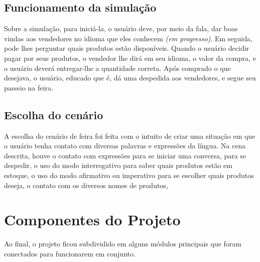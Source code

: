 \documentclass[a4paper]{article}
\begin{document}
    \subsection{Funcionamento da simulação}

        Sobre a simulação, para iniciá-la, o usuário deve, por meio da fala, dar
        boas vindas aos vendedores no idioma que eles conhecem \emph{(em
        progresso)}. Em seguida,
        pode lhes perguntar quais produtos estão disponíveis.
        Quando o usuário decidir pagar por seus
        produtos, o vendedor lhe dirá em seu idioma, o valor da compra, e o
        usuário deverá entregar-lhe a quantidade correta. Após comprado o que
        desejava, o usuário, educado que é, dá uma despedida aos vendedores, e
        segue seu passeio na feira.

    \subsection{Escolha do cenário}

        A escolha do cenário de feira foi feita com o intuito de criar uma
        situação em que o usuário tenha contato com diversas palavras e
        expressões da língua. Na cena descrita, houve o contato com expressões
        para se iniciar uma conversa, para se despedir, o uso do modo
        interrogativo para saber quais produtos estão em estoque, o uso do modo
        afirmativo ou imperativo para se escolher quais produtos deseja, o
        contato com os diversos nomes de produtos, 


    \section{Componentes do Projeto}

        Ao final, o projeto ficou subdividido em alguns módulos principais que
        foram conectados para funcionarem em conjunto. 
        
\end{document}
